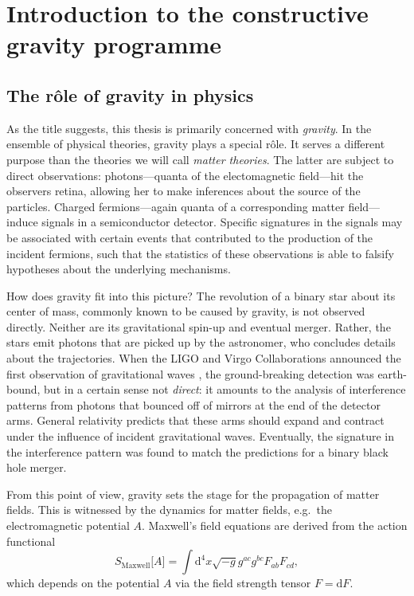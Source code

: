 \chapter{Introduction to the constructive gravity programme}

\section{The r\^ole of gravity in physics}
As the title suggests, this thesis is primarily concerned with \emph{gravity}. In the ensemble of physical theories, gravity plays a special r\^ole. It serves a different purpose than the theories we will call \emph{matter theories}. The latter are subject to direct observations: photons---quanta of the electomagnetic field---hit the observers retina, allowing her to make inferences about the source of the particles. Charged fermions---again quanta of a corresponding matter field---induce signals in a semiconductor detector. Specific signatures in the signals may be associated with certain events that contributed to the production of the incident fermions, such that the statistics of these observations is able to falsify hypotheses about the underlying mechanisms.

How does gravity fit into this picture? The revolution of a binary star about its center of mass, commonly known to be caused by gravity, is not observed directly. Neither are its gravitational spin-up and eventual merger. Rather, the stars emit photons that are picked up by the astronomer, who concludes details about the trajectories. When the LIGO and Virgo Collaborations announced the first observation of gravitational waves \cite{ligo}, the ground-breaking detection was earth-bound, but in a certain sense not \emph{direct}: it amounts to the analysis of interference patterns from photons that bounced off of mirrors at the end of the detector arms. General relativity predicts that these arms should expand and contract under the influence of incident gravitational waves. Eventually, the signature in the interference pattern was found to match the predictions for a binary black hole merger.

From this point of view, gravity sets the stage for the propagation of matter fields. This is witnessed by the dynamics for matter fields, e.g.~the electromagnetic potential $A$. Maxwell's field equations are derived from the action functional
\begin{equation*}
  S_\text{Maxwell}\lbrack A\rbrack = \int\mathrm d^4x \sqrt{-g} g^{ac} g^{bc} F_{ab} F_{cd},
\end{equation*}
which depends on the potential $A$ via the field strength tensor $F = \mathrm dF$.

